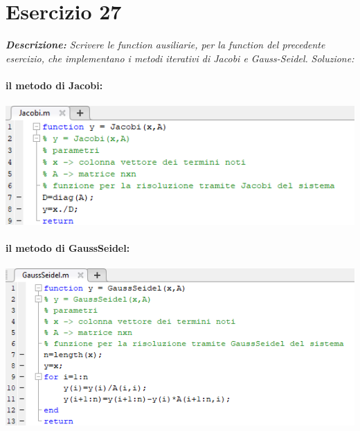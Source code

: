 \section{Esercizio 27}
\textit{\textbf{Descrizione:}  Scrivere le function ausiliarie, per la function del precedente esercizio, che implementano i metodi iterativi di Jacobi e Gauss-Seidel.}\newline
\emph{Soluzione: }\\~\\
\textbf{il metodo di Jacobi:}
\\~\\
\includegraphics[width=1.3\linewidth]{img/Jacobi}\\~\\
\textbf{il metodo di GaussSeidel:}
\\~\\
\includegraphics[width=1.3\linewidth]{img/GS}\newpage